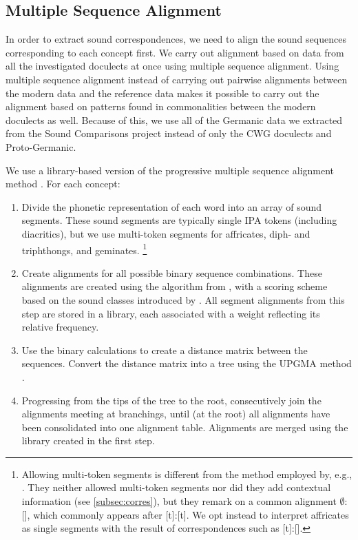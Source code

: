 \documentclass[a4paper]{article}
\begin{document}
\subsection{Multiple Sequence Alignment}
\label{subsec:msa}

In order to extract sound correspondences,
we need to align the sound sequences corresponding to each concept first.
We carry out alignment based on data from
all the investigated doculects at once using multiple sequence alignment.
Using multiple sequence alignment instead of carrying out
pairwise alignments between the modern data and the reference data
makes it possible to carry out the alignment
based on patterns found in commonalities between the modern doculects as well.
Because of this, we use all of the Germanic data
we extracted from the Sound Comparisons project
instead of only the CWG doculects and Proto-Germanic.

We use a library-based version \citep{notredame2000t-coffee:} of the progressive multiple sequence alignment method \citep{thompson1994clustal}.
For each concept:

\begin{enumerate}
\item
Divide the phonetic representation of each word into an array of sound segments.
These sound segments are typically single IPA tokens (including diacritics), but we use multi-token segments for affricates, diph- and triphthongs, and geminates.
\footnote{
Allowing multi-token segments is different from
the method employed by, e.g., \citet{wieling2010hierarchical}.
They neither allowed multi-token segments nor did they add contextual information
(see \ref{subsec:corres}),
but they remark on a common alignment $\emptyset$:[\textesh],
which commonly appears after [t]:[t].
We opt instead to interpret affricates as single segments with
the result of correspondences such as [t]:[].

}

\item
Create alignments for all possible binary sequence combinations.
These alignments are created using the algorithm from \citet{needleman1970general},
with a scoring scheme based on the sound classes introduced by \citet{list2012sca}.
All segment alignments from this step are stored in a library,
each associated with a weight reflecting its relative frequency.

\item
Use the binary calculations to create a distance matrix between the sequences.
Convert the distance matrix into a tree using the UPGMA method \citep{sokal1958statistical}.

\item 
Progressing from the tips of the tree to the root,
consecutively join the alignments meeting at branchings,
until (at the root) all alignments have been consolidated into one alignment table.
Alignments are merged using the library created in the first step.
\end{enumerate}
\end{document}
